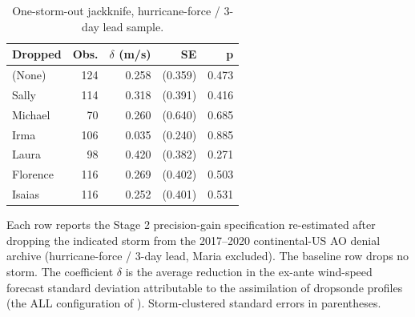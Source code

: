 \begin{table}

\caption{One-storm-out jackknife, hurricane-force / 3-day lead sample. \label{tab:precision_jackknife}}
\centering
\begin{threeparttable}
\begin{tabular}[t]{lrrrr}
\toprule
Dropped & Obs. & $\delta$ (m/s) & SE & p\\
\midrule
(None) & 124 & 0.258 & (0.359) & 0.473\\
Sally & 114 & 0.318 & (0.391) & 0.416\\
Michael & 70 & 0.260 & (0.640) & 0.685\\
Irma & 106 & 0.035 & (0.240) & 0.885\\
Laura & 98 & 0.420 & (0.382) & 0.271\\
Florence & 116 & 0.269 & (0.402) & 0.503\\
Isaias & 116 & 0.252 & (0.401) & 0.531\\
\bottomrule
\end{tabular}
\begin{tablenotes}
\small
\item Each row reports the Stage 2 precision-gain specification re-estimated after dropping the indicated storm from the 2017--2020 continental-US AO denial archive (hurricane-force / 3-day lead, Maria excluded). The baseline row drops no storm. The coefficient $\delta$ is the average reduction in the ex-ante wind-speed forecast standard deviation attributable to the assimilation of dropsonde profiles (the ALL configuration of \citet{DitchekEA2023}). Storm-clustered standard errors in parentheses.
\end{tablenotes}
\end{threeparttable}
\end{table}
